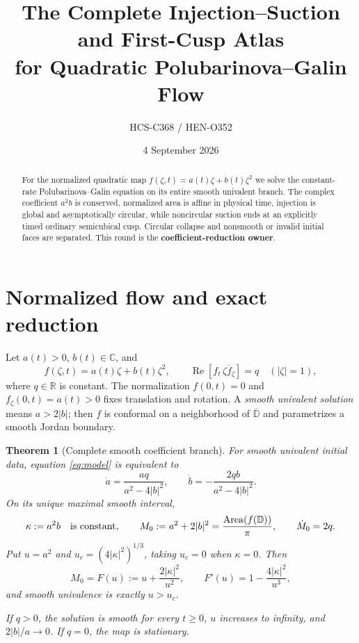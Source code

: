 \documentclass[10pt]{article}
\title{The Complete Injection--Suction and First-Cusp Atlas\\
for Quadratic Polubarinova--Galin Flow}
\author{HCS-C368 / HEN-O352}
\date{4 September 2026}
\newtheorem{theorem}{Theorem}
\newcommand{\D}{\mathbb D}
\newcommand{\Real}{\operatorname{Re}}
\begin{document}
\maketitle
\begin{abstract}
For the normalized quadratic map $f(\zeta,t)=a(t)\zeta+b(t)\zeta^2$
we solve the constant-rate Polubarinova--Galin equation on its entire smooth
univalent branch.  The complex coefficient $a^2b$ is conserved, normalized
area is affine in physical time, injection is global and asymptotically
circular, while noncircular suction ends at an explicitly timed ordinary
semicubical cusp.  Circular collapse and nonsmooth or invalid initial faces
are separated.  This round is the \textbf{coefficient-reduction owner}.
\end{abstract}

\section{Normalized flow and exact reduction}
Let $a(t)>0$, $b(t)\in\mathbb C$, and
\begin{equation}\label{eq:model}
 f(\zeta,t)=a(t)\zeta+b(t)\zeta^2,
 \qquad
 \Real\!\left[f_t\,\overline{\zeta f_\zeta}\right]=q
 \quad (|\zeta|=1),
\end{equation}
where $q\in\mathbb R$ is constant.  The normalization $f(0,t)=0$ and
$f_\zeta(0,t)=a(t)>0$ fixes translation and rotation.  A \emph{smooth
univalent solution} means $a>2|b|$; then $f$ is conformal on a neighborhood
of $\overline{\D}$ and parametrizes a smooth Jordan boundary.

\begin{theorem}[Complete smooth coefficient branch]\label{thm:main}
For smooth univalent initial data, equation \eqref{eq:model} is equivalent to
\begin{equation}\label{eq:ode}
 \dot a=\frac{aq}{a^2-4|b|^2},\qquad
 \dot b=-\frac{2qb}{a^2-4|b|^2}.
\end{equation}
On its unique maximal smooth interval,
\begin{equation}\label{eq:invariants}
 \kappa:=a^2b\quad\hbox{is constant},\qquad
 M_0:=a^2+2|b|^2=\frac{\operatorname{Area}(f(\D))}{\pi},\qquad
 \dot M_0=2q.
\end{equation}
Put $u=a^2$ and $u_c=(4|\kappa|^2)^{1/3}$, taking $u_c=0$ when
$\kappa=0$.  Then
\begin{equation}\label{eq:F}
 M_0=F(u):=u+\frac{2|\kappa|^2}{u^2},\qquad
 F'(u)=1-\frac{4|\kappa|^2}{u^3},
\end{equation}
and smooth univalence is exactly $u>u_c$.

If $q>0$, the solution is smooth for every $t\ge0$, $u$ increases to
infinity, and $2|b|/a\to0$.  If $q=0$, the map is stationary.
\end{theorem}
\end{document}
